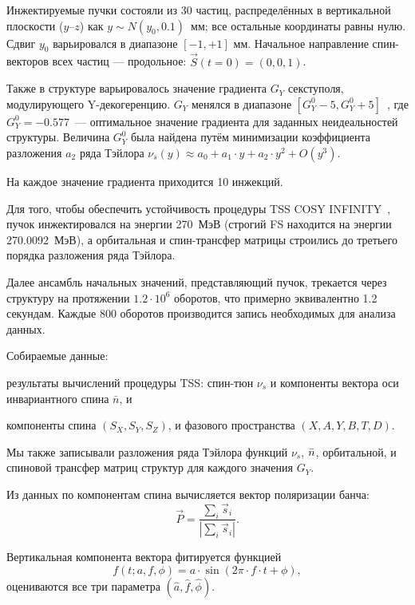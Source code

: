 Инжектируемые пучки состояли из 30 частиц, распределённых в вертикальной
плоскости ($y$--$z$) как ${y\sim N(y_0, 0.1)}$~мм; все остальные координаты равны нулю.
Сдвиг $y_0$ варьировался в диапазоне ${[-1, +1]}$ мм. Начальное
направление спин-векторов всех частиц --- продольное: ${\vec S(t=0) = (0,0,1)}$.

Также в структуре варьировалось значение градиента $G_Y$ секступоля,
модулирующего Y-декогеренцию. $G_Y$ менялся в
диапазоне ${[G_Y^0 - 5, G_Y^0 + 5]}$~\Tlmsq, где
${G_Y^0=-0.577}$~\Tlmsq --- оптимальное значение градиента для заданных 
неидеальностей структуры. Величина $G_Y^0$ была найдена путём минимизации коэффициента разложения $a_2$
ряда Тэйлора ${\nu_s(y) \approx a_0 + a_1\cdot y + a_2\cdot y^2 + O(y^3)}$.

На каждое значение градиента приходится 10 инжекций.

Для того, чтобы обеспечить устойчивость процедуры TSS COSY INFINITY~\cite{COSYINF:Manual:BeamPhys}, пучок инжектировался на энергии 270~МэВ (строгий FS находится на энергии 270.0092~МэВ), а 
орбитальная и спин-трансфер матрицы  строились до третьего порядка разложения ряда Тэйлора. 

Далее ансамбль начальных значений, представляющий пучок, трекается
через структуру на протяжении $1.2\cdot10^6$ оборотов, что
примерно эквивалентно 1.2 секундам. Каждые 800 оборотов производится
запись необходимых для анализа данных.

Собираемые данные: 
\begin{enumerate*}
	\item результаты вычислений процедуры TSS: спин-тюн $\nu_s$ и компоненты вектора оси инвариантного спина $\bar n$, и
	\item компоненты спина $(S_X, S_Y, S_Z)$, и фазового пространства $(X,A,Y,B,T,D)$.
\end{enumerate*}
Мы также записывали разложения ряда Тэйлора функций $\nu_s$, $\bar n$, орбитальной, и спиновой трансфер матриц
структур для каждого значения $G_Y$.

Из данных по компонентам спина вычисляется вектор поляризации банча:
\begin{equation}\label{eq:polarization_formula}
\vec P = \frac{\sum_i\vec s_i}{|\sum_i\vec s_i|}.
\end{equation}

Вертикальная компонента вектора фитируется функцией 
\[
{f(t; a,f,\phi) = a\cdot \sin(2\pi\cdot f\cdot t + \phi)},
\]
оцениваются все три параметра 
${(\hat a, \hat f, \hat\phi)}$. 

